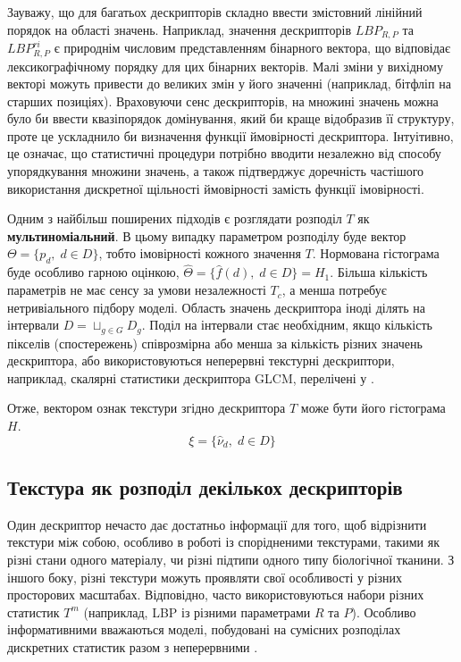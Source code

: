 Зауважу, що для багатьох дескрипторів складно ввести змістовний лінійний порядок на області значень. 
Наприклад, значення дескрипторів $LBP_{R,P}$ та $LBP^{ri}_{R,P}$ є природнім числовим представленням бінарного вектора, що відповідає лексикографічному порядку для цих бінарних векторів.
Малі зміни у вихідному векторі можуть привести до великих змін у його значенні (наприклад, бітфліп на старших позиціях).
Враховуючи сенс дескрипторів, на множині значень можна було би ввести квазіпорядок домінування, який би краще відобразив її структуру, проте це ускладнило би визначення функції ймовірності дескриптора.
Інтуітивно, це означає, що статистичні процедури потрібно вводити незалежно від способу упорядкування множини значень, 
а також підтверджує доречність частішого використання дискретної щільності ймовірності замість функції імовірності.

Одним з найбільш поширених підходів є розглядати розподіл $T$ як \textbf{мультиноміальний}. 
В цьому випадку параметром розподілу буде вектор $\Theta = \{p_d, \; d\in D\}$, тобто імовірності кожного значення $T$.
Нормована гістограма буде особливо гарною оцінкою, $\hat \Theta = \{\hat f(d), \; d\in D\} = H_1$.
Більша кількість параметрів не має сенсу за умови незалежності $T_c$, а менша потребує нетривіального підбору моделі.
Область значень дескриптора іноді ділять на інтервали $D = \sqcup_{g\in G} D_g$.
Поділ на інтервали стає необхідним, якщо кількість пікселів (спостережень) співрозмірна або менша за кількість різних значень дескриптора, 
або використовуються неперервні текстурні дескриптори, наприклад, скалярні статистики дескриптора GLCM, перелічені у \cite{belsare2015}.

Отже, вектором ознак текстури згідно дескриптора $T$ може бути його гістограма $H$.
\begin{equation*}
    \xi = \{\hat\nu_d, \; d\in D\}
\end{equation*}

\subsection{Текстура як розподіл декількох дескрипторів}\label{section1.2b}\hfill

Один дескриптор нечасто дає достатньо інформації для того, щоб відрізнити текстури між собою, особливо в роботі із спорідненими текстурами, 
такими як різні стани одного матеріалу, чи різні підтипи одного типу біологічної тканини.
З іншого боку, різні текстури можуть проявляти свої особливості у різних просторових масштабах.
Відповідно, часто використовуються набори різних статистик $T^m$ (наприклад, LBP із різними параметрами $R$ та $P$).
Особливо інформативними вважаються моделі, побудовані на сумісних розподілах дискретних статистик разом з неперервними \cite{guo2010lbpv}.

